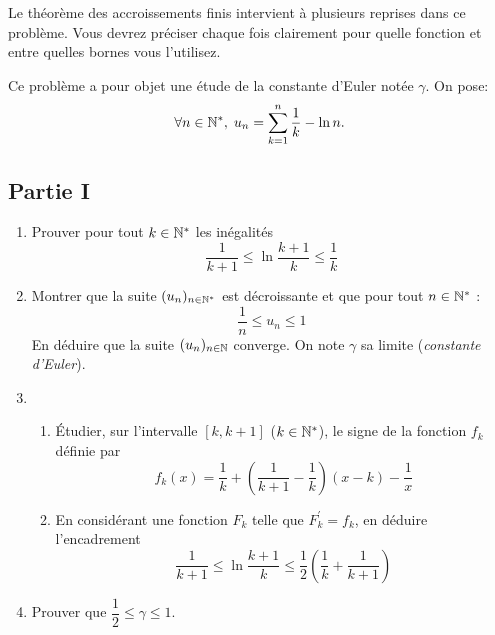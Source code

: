 Le théorème des accroissements finis intervient à plusieurs reprises dans ce problème. Vous devrez préciser chaque fois clairement pour quelle fonction et entre quelles bornes vous l'utilisez.

Ce problème a pour objet une étude de la constante d'Euler notée $\gamma$. On pose:
\[
\forall n \in \mathbb{N}^*, \; u_n=\sum _{k=1}^{n}\frac{1}{k} - \ln n.
\]
\subsection*{Partie I}
\begin{enumerate}
\item Prouver pour tout $k\in \mathbb{N}^*$ les inégalités
\[\frac{1}{k+1}\leq \ln \frac{k+1}{k} \leq \frac{1}{k}\]
\item Montrer que la suite $(u_n)_{n\in\mathbb{N}^*}$ est décroissante et que  pour tout $n \in \mathbb{N}^*$ :
\[\frac{1}{n}\leq u_n \leq 1\]
En déduire que la suite $(u_n)_{n\in\mathbb{N}}$ converge. On note $\gamma$ sa limite (\emph{constante d'Euler}).
\item \begin{enumerate}
\item \'Etudier, sur l'intervalle $[k,k+1]$ ($k\in \mathbb{N}^*$), le signe de la fonction $f_k$ définie par
\[f_k (x)=\frac{1}{k}+(\frac{1}{k+1}-\frac{1}{k})(x-k)-\frac{1}{x}\]
\item En considérant une fonction $F_k$ telle que $F_k ^\prime = f_k$, en déduire l'encadrement
\[\frac{1}{k+1}\leq \ln \frac{k+1}{k} \leq \frac{1}{2}(\frac{1}{k}+\frac{1}{k+1})\]
\end{enumerate}
\item Prouver que $\dfrac{1}{2}\leq \gamma \leq 1$.
\end{enumerate}
